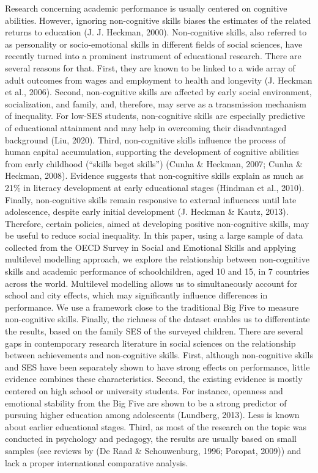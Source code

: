 \documentclass[
  12pt,
  a4paper,
]{article}
\begin{document}
Research concerning academic performance is usually centered on
cognitive abilities. However, ignoring non-cognitive skills biases the
estimates of the related returns to education (J. J. Heckman, 2000).
Non-cognitive skills, also referred to as personality or socio-emotional
skills in different fields of social sciences, have recently turned into
a prominent instrument of educational research. There are several
reasons for that. First, they are known to be linked to a wide array of
adult outcomes from wages and employment to health and longevity (J.
Heckman et al., 2006). Second, non-cognitive skills are affected by
early social environment, socialization, and family, and, therefore, may
serve as a transmission mechanism of inequality. For low-SES students,
non-cognitive skills are especially predictive of educational attainment
and may help in overcoming their disadvantaged background (Liu, 2020).
Third, non-cognitive skills influence the process of human capital
accumulation, supporting the development of cognitive abilities from
early childhood (``skills beget skills'') (Cunha \& Heckman, 2007; Cunha
\& Heckman, 2008). Evidence suggests that non-cognitive skills explain
as much as 21\% in literacy development at early educational stages
(Hindman et al., 2010). Finally, non-cognitive skills remain responsive
to external influences until late adolescence, despite early initial
development (J. Heckman \& Kautz, 2013). Therefore, certain policies,
aimed at developing positive non-cognitive skills, may be useful to
reduce social inequality. In this paper, using a large sample of data
collected from the OECD Survey in Social and Emotional Skills and
applying multilevel modelling approach, we explore the relationship
between non-cognitive skills and academic performance of schoolchildren,
aged 10 and 15, in 7 countries across the world. Multilevel modelling
allows us to simultaneously account for school and city effects, which
may significantly influence differences in performance. We use a
framework close to the traditional Big Five to measure non-cognitive
skills. Finally, the richness of the dataset enables us to differentiate
the results, based on the family SES of the surveyed children. There are
several gaps in contemporary research literature in social sciences on
the relationship between achievements and non-cognitive skills. First,
although non-cognitive skills and SES have been separately shown to have
strong effects on performance, little evidence combines these
characteristics. Second, the existing evidence is mostly centered on
high school or university students. For instance, openness and emotional
stability from the Big Five are shown to be a strong predictor of
pursuing higher education among adolescents (Lundberg, 2013). Less is
known about earlier educational stages. Third, as most of the research
on the topic was conducted in psychology and pedagogy, the results are
usually based on small samples (see reviews by (De Raad \& Schouwenburg,
1996; Poropat, 2009)) and lack a proper international comparative
analysis.
\end{document}

